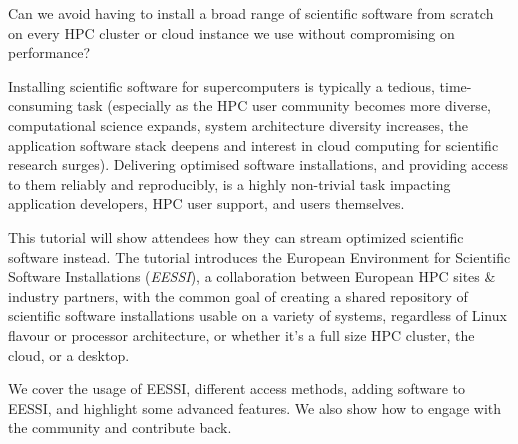 Can we avoid having to install a broad range of scientific software from scratch on every HPC cluster or
cloud instance we use without compromising on performance?

Installing scientific software for supercomputers is typically a tedious, time-consuming task (especially as the
HPC user community becomes more diverse, computational science expands, system architecture diversity increases, the
application software stack deepens and interest in cloud computing for scientific research surges).
Delivering optimised software installations, and providing access to them reliably and reproducibly,
is a highly non-trivial task impacting application developers, HPC user support, and users themselves.

This tutorial will show attendees how they can stream optimized scientific software instead.
The tutorial introduces the European Environment for Scientific Software Installations (\emph{EESSI}), a collaboration
between European HPC sites \& industry partners, with the common goal of creating a shared repository of scientific
software installations usable on a variety of systems, regardless of Linux flavour or processor architecture, or
whether it's a full size HPC cluster, the cloud, or a desktop.

We cover the usage of EESSI, different access methods, adding software to EESSI, and highlight some advanced features.
We also show how to engage with the community and contribute back.

